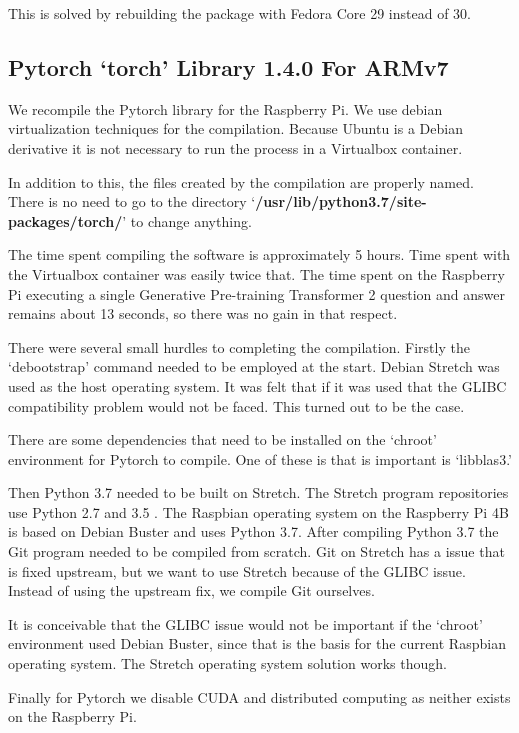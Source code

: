 This is solved by rebuilding the package with Fedora Core 29 instead of 30. 
 
\subsection{Pytorch `torch' Library 1.4.0 For ARMv7}
We recompile the Pytorch library for the Raspberry Pi. We use debian virtualization techniques for the compilation. Because Ubuntu is a Debian derivative it is not necessary to run the process in a Virtualbox container. 

In addition to this, the files created by the compilation are properly named. There is no need to go to the directory `\textbf{/usr/lib/python3.7/site-packages/torch/}' to change anything. 

The time spent compiling the software is approximately 5 hours. Time spent with the Virtualbox container was easily twice that. The time spent on the Raspberry Pi executing a single Generative Pre-training Transformer 2 question and answer remains about 13 seconds, so there was no gain in that respect.

There were several small hurdles to completing the compilation. Firstly the `debootstrap' command needed to be employed at the start. Debian Stretch was used as the host operating system. It was felt that if it was used that the GLIBC compatibility problem would not be faced. This turned out to be the case.

There are some dependencies that need to be installed on the `chroot' environment for Pytorch to compile. One of these is that is important is `libblas3.'

Then Python 3.7 needed to be built on Stretch. The Stretch program repositories use Python 2.7 and 3.5 . The Raspbian operating system on the Raspberry Pi 4B is based on Debian Buster and uses Python 3.7. After compiling Python 3.7 the Git program needed to be compiled from scratch. Git on Stretch has a issue that is fixed upstream, but we want to use Stretch because of the GLIBC issue. Instead of using the upstream fix, we compile Git ourselves.

It is conceivable that the GLIBC issue would not be important if the `chroot' environment used Debian Buster, since that is the basis for the current Raspbian operating system. The Stretch operating system solution works though.

Finally for Pytorch we disable CUDA and distributed computing as neither exists on the Raspberry Pi.

